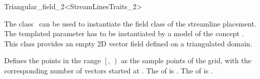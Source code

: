 

\begin{ccRefClass}{Triangular_field_2<StreamLinesTraits_2>}  %

\ccDefinition
  
The class \ccRefName\ can be used to instantiate the field class of
the streamline placement.  The templated parameter  has to be
instantiated by a model of the concept .\\
This class provides an empty 2D vector field defined on a triangulated domain.

\ccCreation
{}  %


\ccThreeToTwo
{}
{		Defines the points in the range  
		$\left[\right.$, $\left.\right)$ 
		as the sample points of the grid, with the corresponding number of vectors started at .
\ccPrecond The  of  is .
\ccPrecond The  of  is .}

\ccIsModel 

 \\


\ccSeeAlso
{} \\
\end{ccRefClass}


